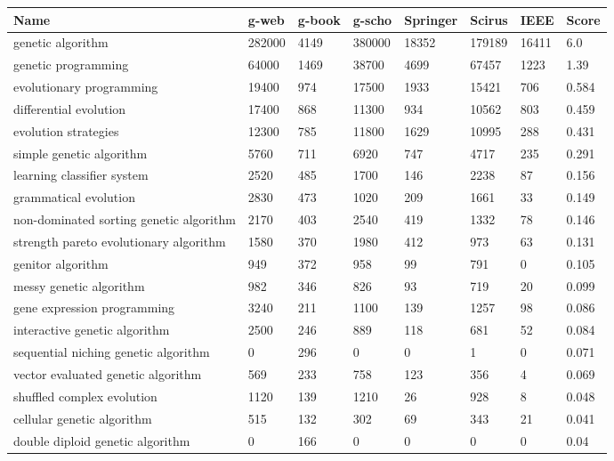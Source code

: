\documentclass[a4paper, 11pt]{article}
\begin{document}
\begin{table}[htp]
	\centering\footnotesize
		\begin{tabularx}{\textwidth}{Xlllllll}
		\toprule
		\textbf{Name} & \textbf{g-web} & \textbf{g-book} & \textbf{g-scho} & \textbf{Springer} & \textbf{Scirus} & \textbf{IEEE} & \textbf{Score} \\ 
		\toprule
		genetic algorithm & 282000 & 4149 & 380000 & 18352 & 179189 & 16411 & 6.0 \\
		genetic programming & 64000 & 1469 & 38700 & 4699 & 67457 & 1223 & 1.39 \\
		evolutionary programming & 19400 & 974 & 17500 & 1933 & 15421 & 706 & 0.584 \\
		differential evolution & 17400 & 868 & 11300 & 934 & 10562 & 803 & 0.459 \\
		evolution strategies & 12300 & 785 & 11800 & 1629 & 10995 & 288 & 0.431 \\
		simple genetic algorithm & 5760 & 711 & 6920 & 747 & 4717 & 235 & 0.291 \\
		learning classifier system & 2520 & 485 & 1700 & 146 & 2238 & 87 & 0.156 \\
		grammatical evolution & 2830 & 473 & 1020 & 209 & 1661 & 33 & 0.149 \\
		non-dominated sorting genetic algorithm & 2170 & 403 & 2540 & 419 & 1332 & 78 & 0.146 \\
		strength pareto evolutionary algorithm & 1580 & 370 & 1980 & 412 & 973 & 63 & 0.131 \\
		genitor algorithm & 949 & 372 & 958 & 99 & 791 & 0 & 0.105 \\
		messy genetic algorithm & 982 & 346 & 826 & 93 & 719 & 20 & 0.099 \\
		gene expression programming & 3240 & 211 & 1100 & 139 & 1257 & 98 & 0.086 \\
		interactive genetic algorithm & 2500 & 246 & 889 & 118 & 681 & 52 & 0.084 \\
		sequential niching genetic algorithm & 0 & 296 & 0 & 0 & 1 & 0 & 0.071 \\
		vector evaluated genetic algorithm & 569 & 233 & 758 & 123 & 356 & 4 & 0.069 \\
		shuffled complex evolution & 1120 & 139 & 1210 & 26 & 928 & 8 & 0.048 \\
		cellular genetic algorithm & 515 & 132 & 302 & 69 & 343 & 21 & 0.041 \\
		double diploid genetic algorithm & 0 & 166 & 0 & 0 & 0 & 0 & 0.04 \\

\end{tabularx}
\end{table}
\end{document}
